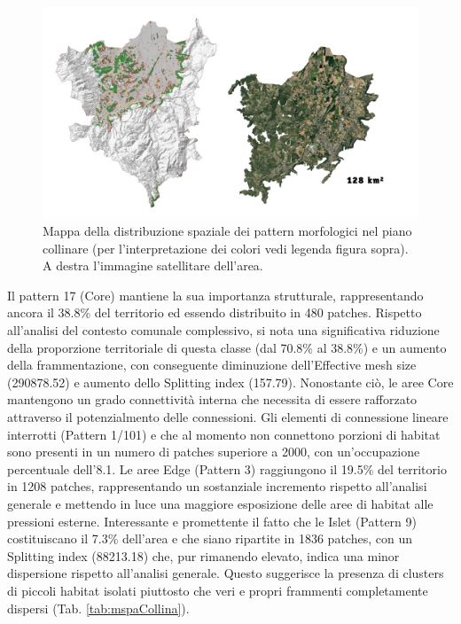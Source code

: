\documentclass[
]{book}
\begin{document}
\begin{figure}

{\centering \includegraphics[width=\linewidth]{./figs/mspa8211_collina} 

}

\caption{Mappa della distribuzione spaziale dei pattern morfologici nel piano collinare (per l'interpretazione dei colori vedi legenda figura sopra). A destra l'immagine satellitare dell'area.}\label{fig:mspaCollina}
\end{figure}

Il pattern 17 (Core) mantiene la sua importanza strutturale, rappresentando ancora il 38.8\% del territorio ed essendo distribuito in 480 patches.
Rispetto all'analisi del contesto comunale complessivo, si nota una significativa riduzione della proporzione territoriale di questa classe (dal 70.8\% al 38.8\%) e un aumento della frammentazione, con conseguente diminuzione dell'Effective mesh size (290878.52) e aumento dello Splitting index (157.79).
Nonostante ciò, le aree Core mantengono un grado connettività interna che necessita di essere rafforzato attraverso il potenzialmento delle connessioni.
Gli elementi di connessione lineare interrotti (Pattern 1/101) e che al momento non connettono porzioni di habitat sono presenti in un numero di patches superiore a 2000, con un'occupazione percentuale dell'8.1.
Le aree Edge (Pattern 3) raggiungono il 19.5\% del territorio in 1208 patches, rappresentando un sostanziale incremento rispetto all'analisi generale e mettendo in luce una maggiore esposizione delle aree di habitat alle pressioni esterne.
Interessante e promettente il fatto che le Islet (Pattern 9) costituiscano il 7.3\% dell'area e che siano ripartite in 1836 patches, con un Splitting index (88213.18) che, pur rimanendo elevato, indica una minor dispersione rispetto all'analisi generale.
Questo suggerisce la presenza di clusters di piccoli habitat isolati piuttosto che veri e propri frammenti completamente dispersi (Tab. \ref{tab:mspaCollina}).
\end{document}

